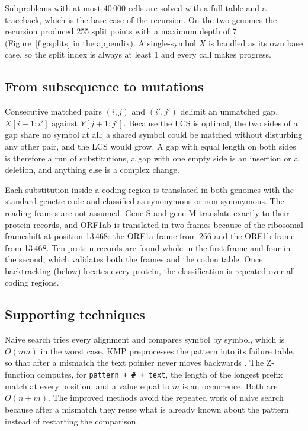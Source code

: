 Subproblems with at most $40\,000$ cells are solved with a full table and a traceback, which is the
base case of the recursion. On the two genomes the recursion produced 255 split points with a
maximum depth of 7 (Figure~\ref{fig:splits} in the appendix). A single-symbol $X$ is handled as its
own base case, so the split index is always at least 1 and every call makes progress.

\subsection{From subsequence to mutations}

Consecutive matched pairs $(i, j)$ and $(i', j')$ delimit an unmatched gap, $X[i+1:i']$ against
$Y[j+1:j']$. Because the LCS is optimal, the two sides of a gap share no symbol at all: a shared
symbol could be matched without disturbing any other pair, and the LCS would grow. A gap with equal length on both sides is therefore a run of substitutions, a gap with one
empty side is an insertion or a deletion, and anything else is a complex change.



Each substitution inside a coding region is translated in both genomes with the standard genetic
code and classified as synonymous or non-synonymous. The reading frames are not assumed. Gene S and
gene M translate exactly to their protein records, and ORF1ab is translated in two frames because of
the ribosomal frameshift at position 13\,468: the ORF1a frame from 266 and the ORF1b frame from
13\,468. Ten protein records are found whole in the first frame and four in the second, which
validates both the frames and the codon table. Once backtracking (below) locates every protein, the
classification is repeated over all coding regions.

\subsection{Supporting techniques}

Naive search tries every alignment and compares symbol by symbol, which is $O(nm)$ in the worst
case. KMP preprocesses the pattern into its failure table, so that after a mismatch the text pointer
never moves backwards \citep{kmp1977}. The Z-function computes, for \texttt{pattern + \# + text}, the
length of the longest prefix match at every position, and a value equal to $m$ is an occurrence. Both
are $O(n + m)$. The improved methods avoid the repeated work of naive search because after a mismatch
they reuse what is already known about the pattern instead of restarting the comparison.

